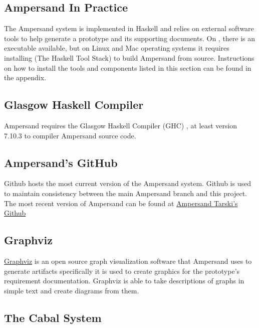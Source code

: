 \documentclass[journal,12pt,onecolumn,draftclsnofoot]{report}
\let\Oldsubsection\subsection
\renewcommand{\subsection}{\FloatBarrier\Oldsubsection}
\begin{document}
\subsection{Ampersand In Practice}

The Ampersand system is implemented in Haskell and relies on external software 
tools to help generate a prototype and its supporting documents.
On , 
there is an executable available, but on Linux and Mac operating systems it 
requires installing  (The Haskell Tool Stack)
to build Ampersand from source. 
Instructions on how to install the tools and components listed in this section 
can be found in the appendix.

\subsection*{Glasgow Haskell Compiler}

Ampersand requires the Glasgow Haskell Compiler (GHC) \cite{ghc}, at least version 
7.10.3 to compiler Ampersand source code. 

\subsection*{Ampersand's GitHub}\label{Github}

Github hosts the most current version of the Ampersand system. Github is used 
to maintain consistency between the main Ampersand branch and this project. The 
most recent version of Ampersand can be found at 
\href{https://github.com/AmpersandTarski}{Ampersand Tarski's Github }

\subsection*{Graphviz}

\href{http://www.softpedia.com/get/Others/Miscellaneous/Graphviz.shtml}{Graphviz}
 is an open source graph visualization software that Ampersand uses to generate 
 artifacts specifically it is used to create graphics for the prototype's 
 requirement documentation. Graphviz is able to take descriptions of graphs in 
 simple text and create diagrams from them. 

\subsection*{The Cabal System}
\end{document}

